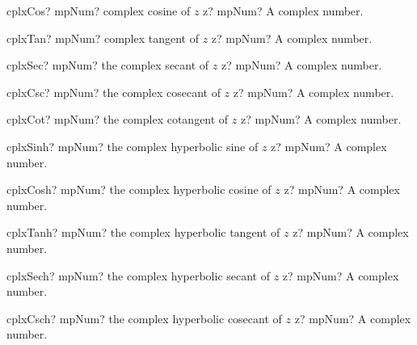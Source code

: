 \documentclass[12pt,a4paper,openany]{book}
\begin{document}
\begin{mpFunctionsExtract}
\mpFunctionOne
{cplxCos? mpNum? complex cosine of $z$}
{z? mpNum? A complex number.}
\end{mpFunctionsExtract}

\begin{mpFunctionsExtract}
\mpFunctionOne
{cplxTan? mpNum? complex tangent of $z$}
{z? mpNum? A complex number.}
\end{mpFunctionsExtract}

\begin{mpFunctionsExtract}
\mpFunctionOne
{cplxSec? mpNum? the complex secant of $z$}
{z? mpNum? A complex number.}
\end{mpFunctionsExtract}

\begin{mpFunctionsExtract}
\mpFunctionOne
{cplxCsc? mpNum? the complex cosecant of $z$}
{z? mpNum? A complex number.}
\end{mpFunctionsExtract}

\begin{mpFunctionsExtract}
\mpFunctionOne
{cplxCot? mpNum? the complex cotangent of $z$}
{z? mpNum? A complex number.}
\end{mpFunctionsExtract}

\begin{mpFunctionsExtract}
\mpFunctionOne
{cplxSinh? mpNum? the complex hyperbolic sine of $z$}
{z? mpNum? A complex number.}
\end{mpFunctionsExtract}

\begin{mpFunctionsExtract}
\mpFunctionOne
{cplxCosh? mpNum? the complex hyperbolic cosine of $z$}
{z? mpNum? A complex number.}
\end{mpFunctionsExtract}

\begin{mpFunctionsExtract}
\mpFunctionOne
{cplxTanh? mpNum? the complex hyperbolic tangent of $z$}
{z? mpNum? A complex number.}
\end{mpFunctionsExtract}

\begin{mpFunctionsExtract}
\mpFunctionOne
{cplxSech? mpNum? the complex hyperbolic secant of $z$}
{z? mpNum? A complex number.}
\end{mpFunctionsExtract}

\begin{mpFunctionsExtract}
\mpFunctionOne
{cplxCsch? mpNum? the complex hyperbolic cosecant of $z$}
{z? mpNum? A complex number.}
\end{mpFunctionsExtract}
\end{document}
